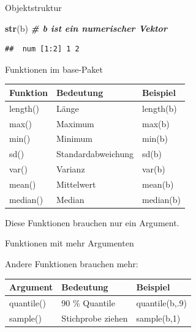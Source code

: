 \documentclass[
  ignorenonframetext,
]{beamer}
\newenvironment{Shaded}{\begin{snugshade}}{\end{snugshade}}
\newcommand{\CommentTok}[1]{\textcolor[rgb]{0.00,0.40,1.00}{\textbf{\textit{#1}}}}
\newcommand{\KeywordTok}[1]{\textcolor[rgb]{0.26,0.66,0.93}{\textbf{#1}}}
\newcommand{\NormalTok}[1]{\textcolor[rgb]{0.74,0.68,0.62}{#1}}
\begin{document}
\begin{frame}[fragile]{Objektstruktur}
\protect\hypertarget{objektstruktur}{}

\begin{Shaded}
\begin{Highlighting}[]
\KeywordTok{str}\NormalTok{(b) }\CommentTok{# b ist ein numerischer Vektor}
\end{Highlighting}
\end{Shaded}

\begin{verbatim}
##  num [1:2] 1 2
\end{verbatim}

\end{frame}

\begin{frame}{Funktionen im base-Paket}
\protect\hypertarget{funktionen-im-base-paket}{}

\begin{longtable}[]{@{}lll@{}}
\toprule
Funktion & Bedeutung & Beispiel\tabularnewline
\midrule
\endhead
length() & Länge & length(b)\tabularnewline
max() & Maximum & max(b)\tabularnewline
min() & Minimum & min(b)\tabularnewline
sd() & Standardabweichung & sd(b)\tabularnewline
var() & Varianz & var(b)\tabularnewline
mean() & Mittelwert & mean(b)\tabularnewline
median() & Median & median(b)\tabularnewline
\bottomrule
\end{longtable}

Diese Funktionen brauchen nur ein Argument.

\end{frame}

\begin{frame}{Funktionen mit mehr Argumenten}
\protect\hypertarget{funktionen-mit-mehr-argumenten}{}

Andere Funktionen brauchen mehr:

\begin{longtable}[]{@{}lll@{}}
\toprule
Argument & Bedeutung & Beispiel\tabularnewline
\midrule
\endhead
quantile() & 90 \% Quantile & quantile(b,.9)\tabularnewline
sample() & Stichprobe ziehen & sample(b,1)\tabularnewline
\bottomrule
\end{longtable}

\end{frame}
\end{document}
